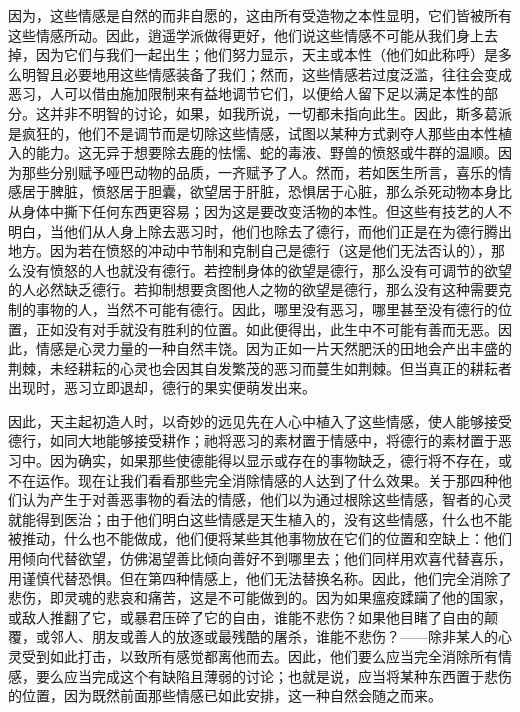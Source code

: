 因为，这些情感是自然的而非自愿的，这由所有受造物之本性显明，它们皆被所有这些情感所动。因此，逍遥学派做得更好，他们说这些情感不可能从我们身上去掉，因为它们与我们一起出生；他们努力显示，天主或本性（他们如此称呼）是多么明智且必要地用这些情感装备了我们；然而，这些情感若过度泛滥，往往会变成恶习，人可以借由施加限制来有益地调节它们，以便给人留下足以满足本性的部分。这并非不明智的讨论，如果，如我所说，一切都未指向此生。因此，斯多葛派是疯狂的，他们不是调节而是切除这些情感，试图以某种方式剥夺人那些由本性植入的能力。这无异于想要除去鹿的怯懦、蛇的毒液、野兽的愤怒或牛群的温顺。因为那些分别赋予哑巴动物的品质，一齐赋予了人。然而，若如医生所言，喜乐的情感居于脾脏，愤怒居于胆囊，欲望居于肝脏，恐惧居于心脏，那么杀死动物本身比从身体中撕下任何东西更容易；因为这是要改变活物的本性。但这些有技艺的人不明白，当他们从人身上除去恶习时，他们也除去了德行，而他们正是在为德行腾出地方。因为若在愤怒的冲动中节制和克制自己是德行（这是他们无法否认的），那么没有愤怒的人也就没有德行。若控制身体的欲望是德行，那么没有可调节的欲望的人必然缺乏德行。若抑制想要贪图他人之物的欲望是德行，那么没有这种需要克制的事物的人，当然不可能有德行。因此，哪里没有恶习，哪里甚至没有德行的位置，正如没有对手就没有胜利的位置。如此便得出，此生中不可能有善而无恶。因此，情感是心灵力量的一种自然丰饶。因为正如一片天然肥沃的田地会产出丰盛的荆棘，未经耕耘的心灵也会因其自发繁茂的恶习而蔓生如荆棘。但当真正的耕耘者出现时，恶习立即退却，德行的果实便萌发出来。\par

因此，天主起初造人时，以奇妙的远见先在人心中植入了这些情感，使人能够接受德行，如同大地能够接受耕作；祂将恶习的素材置于情感中，将德行的素材置于恶习中。因为确实，如果那些使德能得以显示或存在的事物缺乏，德行将不存在，或不在运作。现在让我们看看那些完全消除情感的人达到了什么效果。关于那四种他们认为产生于对善恶事物的看法的情感，他们以为通过根除这些情感，智者的心灵就能得到医治；由于他们明白这些情感是天生植入的，没有这些情感，什么也不能被推动，什么也不能做成，他们便将某些其他事物放在它们的位置和空缺上：他们用倾向代替欲望，仿佛渴望善比倾向善好不到哪里去；他们同样用欢喜代替喜乐，用谨慎代替恐惧。但在第四种情感上，他们无法替换名称。因此，他们完全消除了悲伤，即灵魂的悲哀和痛苦，这是不可能做到的。因为如果瘟疫蹂躏了他的国家，或敌人推翻了它，或暴君压碎了它的自由，谁能不悲伤？如果他目睹了自由的颠覆，或邻人、朋友或善人的放逐或最残酷的屠杀，谁能不悲伤？——除非某人的心灵受到如此打击，以致所有感觉都离他而去。因此，他们要么应当完全消除所有情感，要么应当完成这个有缺陷且薄弱的讨论；也就是说，应当将某种东西置于悲伤的位置，因为既然前面那些情感已如此安排，这一种自然会随之而来。\par


